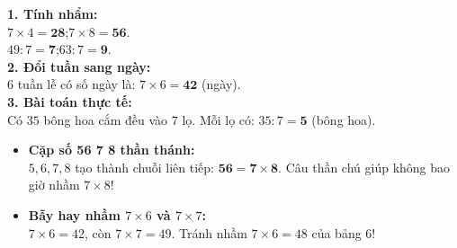 \documentclass[12pt,a4paper]{article}
\begin{document}
\vspace{-2.5mm}
\noindent
\begin{minipage}[t]{0.49\textwidth}\vspace{0pt}
\begin{tcolorbox}[
  enhanced,
  colback=green!4!white,
  colframe=green!60!black,
  arc=2mm, boxrule=0.8pt,
  left=2mm, right=2mm, top=1.8mm, bottom=1.8mm,
  title={\footnotesize\bfseries\color{white}\faCheckCircle\ Ví dụ thực hành chuẩn mực}
]
{\footnotesize
\textbf{1. Tính nhẩm:}\\
$7 \times 4 = \mathbf{28}$;\quad $7 \times 8 = \mathbf{56}$.\\
$49 : 7 = \mathbf{7}$;\quad $63 : 7 = \mathbf{9}$.\\
\textbf{2. Đổi tuần sang ngày:}\\
$6$ tuần lễ có số ngày là: $7 \times 6 = \mathbf{42}$ (ngày).\\
\textbf{3. Bài toán thực tế:}\\
Có $35$ bông hoa cắm đều vào $7$ lọ. Mỗi lọ có: $35 : 7 = \mathbf{5}$ (bông hoa).
}
\end{tcolorbox}
\end{minipage}
\hfill
\begin{minipage}[t]{0.49\textwidth}\vspace{0pt}
\begin{tcolorbox}[
  enhanced,
  colback=red!4!white,
  colframe=red!70!black,
  arc=2mm, boxrule=0.8pt,
  left=2mm, right=2mm, top=1.8mm, bottom=1.8mm,
  title={\footnotesize\bfseries\color{white}\faExclamationTriangle\ Mẹo tránh bẫy trắc nghiệm}
]
{\footnotesize
\begin{itemize}\setlength{\itemsep}{1.5pt}\setlength{\leftskip}{-2.5mm}
  \item \textbf{Cặp số 56 7 8 thần thánh:}\\
  $5, 6, 7, 8$ tạo thành chuỗi liên tiếp: $\mathbf{56 = 7 \times 8}$. Câu thần chú giúp không bao giờ nhầm $7 \times 8$!
  \item \textbf{Bẫy hay nhầm $7 \times 6$ và $7 \times 7$:}\\
  $7 \times 6 = 42$, còn $7 \times 7 = 49$. Tránh nhầm $7 \times 6 = 48$ của bảng 6!
\end{itemize}
}
\end{tcolorbox}
\end{minipage}
\end{document}
